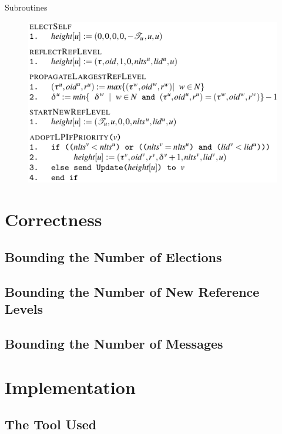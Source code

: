 \documentclass{beamer}
\begin{document}
\begin{frame}{Subroutines}
\begin{figure}[h]
	\centering
	\includegraphics[width=0.8\linewidth]{subroutines.png}
	\label{fig:figure1}
\end{figure}
\end{frame}


\section{Correctness}

\subsection{Bounding the Number of Elections}

\subsection{Bounding the Number of New Reference Levels}

\subsection{Bounding the Number of Messages}

\section{Implementation}
\subsection{The Tool Used}
\end{document}

